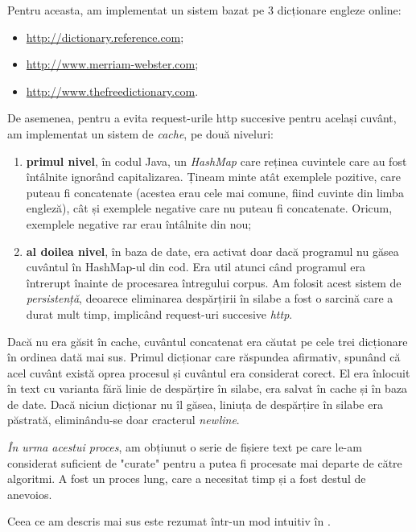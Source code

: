 Pentru aceasta, am implementat un sistem bazat pe 3 dicționare engleze online:

\begin{itemize}
\item \url{http://dictionary.reference.com};
\item \url{http://www.merriam-webster.com};
\item \url{http://www.thefreedictionary.com}.
\end{itemize}

De asemenea, pentru a evita request-urile http succesive pentru același cuvânt, am implementat un sistem de \textit{cache}, pe două niveluri:

\begin{enumerate}
\item \textbf{primul nivel}, în codul Java, un \textit{HashMap} care reținea cuvintele care au fost întâlnite ignorând capitalizarea. Țineam minte atât exemplele pozitive, care puteau fi concatenate (acestea erau cele mai comune, fiind cuvinte din limba engleză), cât și exemplele negative care nu puteau fi concatenate. Oricum, exemplele negative rar erau întâlnite din nou;
\item \textbf{al doilea nivel}, în baza de date, era activat doar dacă programul nu găsea cuvântul în HashMap-ul din cod. Era util atunci când programul era întrerupt înainte de procesarea întregului corpus. Am folosit acest sistem de \textit{persistență}, deoarece eliminarea despărțirii în silabe a fost o sarcină care a durat mult timp, implicând request-uri succesive \textit{http}. 

\end{enumerate}

Dacă nu era găsit în cache, cuvântul concatenat era căutat pe cele trei dicționare în ordinea dată mai sus. Primul dicționar care răspundea afirmativ, spunând că acel cuvânt există oprea procesul și cuvântul era considerat corect. El era înlocuit în text cu varianta fără linie de despărțire în silabe, era salvat în cache și în baza de date. Dacă niciun dicționar nu îl găsea, liniuța de despărțire în silabe era păstrată, eliminându-se doar cracterul \textit{newline}.

\textit{În urma acestui proces}, am obțiunut o serie de fișiere text pe care le-am considerat suficient de "curate" pentru a putea fi procesate mai departe de către algoritmi. A fost un proces lung, care a necesitat timp și a fost destul de anevoios.

Ceea ce am descris mai sus este rezumat într-un mod intuitiv în . 


